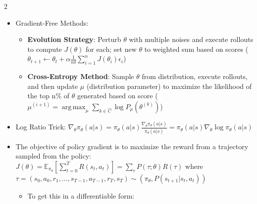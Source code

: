 \documentclass{article}
\providecommand{\tightlist}{%
  \setlength{\itemsep}{\GlobalItemSep}\setlength{\parskip}{\GlobalListParSkip}}
\newlength{\GlobalItemSep}
\newlength{\GlobalListParSkip}
\DeclareMathOperator*{\argmax}{arg\,max}
\begin{document}
\begin{multicols}{2}
\begin{itemize}
\begin{itemize}
    \begin{itemize}
    \tightlist
    \item
      \(a \sim \mathcal{N} (\mu (s), \sigma^2)\)
    \item
      \(\nabla \theta \log(\pi_\theta) (a |s) = \frac{(a - \mu(s)) \phi(s)}{\sigma^2}\)
    \end{itemize}
  \end{itemize}
\item
  Gradient-Free Methods:

  \begin{itemize}
  \tightlist
  \item
    \textbf{Evolution Strategy}: Perturb \(\theta\) with multiple noises
    and execute rollouts to compute \(J(\theta)\) for each; set new
    \(\theta\) to weighted sum based on scores
    (\(\theta_{t+1} \leftarrow \theta_t + \alpha \frac{1}{n \delta} \sum_{i=1}^n J(\theta_i) \epsilon_i\))
  \item
    \textbf{Cross-Entropy Method}: Sample \(\theta\) from distribution,
    execute rollouts, and then update \(\mu\) (distribution parameter)
    to maximize the likelihood of the top n\% of \(\theta\) generated
    based on score
    (\(\mu^{(i+1)} = \argmax_\mu \sum_{k \in \hat{C}} \log P_\mu (\theta^{(k)})\))
  \end{itemize}
\item
  Log Ratio Trick:
  \(\nabla_\theta \pi_\theta (a|s) = \pi_\theta (a|s) \frac{\nabla_\theta \pi_\theta (a|s)}{\pi_\theta (a|s)} = \pi_\theta (a|s) \nabla_\theta \log \pi_\theta (a|s)\)
\item
  The objective of policy gradient is to maximize the reward from a
  trajectory sampled from the policy:
  \(J(\theta) = \mathbb{E}_{\pi_\theta}[\sum_{t=0}^T R(s_t, a_t)] = \sum_\tau P(\tau ; \theta) R(\tau)\)
  where
  \(\tau = (s_0, a_0, r_1, ..., s_{T-1}, a_{T-1}, r_T, s_T) \sim (\pi_\theta, P(s_{t+1} | s_t, a_t))\)

  \begin{itemize}
  \tightlist
  \item
    To get this in a differentiable form:


\end{itemize}
\end{itemize}
\end{multicols}
\end{document}
